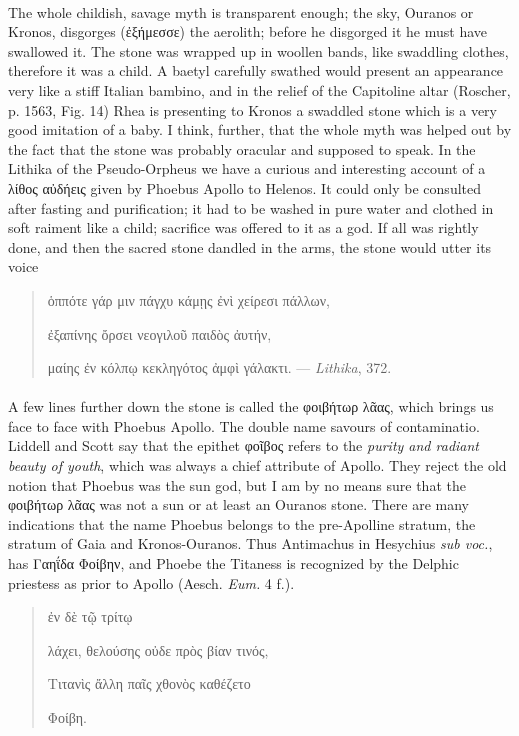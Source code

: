 \documentclass[a4paper, 11pt, oneside, polutonikogreek, english]{article}
\begin{document}
\paragraph{}
The whole childish, savage myth is transparent enough; the sky, Ouranos or Kronos, disgorges (ἐξήμεσσε) the aerolith; before he disgorged it he must have swallowed it. The stone was wrapped up in woollen bands, like swaddling clothes, therefore it was a child. A baetyl carefully swathed would present an appearance very like a stiff Italian bambino, and in the relief of the Capitoline altar (Roscher, p. 1563, Fig. 14) Rhea is presenting to Kronos a swaddled stone which is a very good imitation of a baby. I think, further, that the whole myth was helped out by the fact that the stone was probably oracular and supposed to speak. In the Lithika of the Pseudo-Orpheus we have a curious and interesting account of a λίθος αὐδήεις given by Phoebus Apollo to Helenos. It could only be consulted after fasting and purification; it had to be washed in pure water and clothed in soft raiment like a child; sacrifice was offered to it as a god. If all was rightly done, and then the sacred stone dandled in the arms, the stone would utter its voice
\begin{quotation}
ὁππότε γάρ μιν πάγχυ κάμῃς ἐνὶ χείρεσι πάλλων,

ἐξαπίνης ὄρσει νεογιλοῦ παιδὸς ἀυτήν,

μαίης ἐν κόλπῳ κεκληγότος ἀμφὶ γάλακτι. --- \emph{Lithika}, 372.
\end{quotation}
\paragraph{}
A few lines further down the stone is called the φοιβήτωρ λᾶας, which brings us face to face with Phoebus Apollo. The double name savours of contaminatio. Liddell and Scott say that the epithet φοῖβος refers to the \emph{purity and radiant beauty of youth}, which was always a chief attribute of Apollo. They reject the old notion that Phoebus was the sun god, but I am by no means sure that the φοιβήτωρ λᾶας was not a sun or at least an Ouranos stone. There are many indications that the name Phoebus belongs to the pre-Apolline stratum, the stratum of Gaia and Kronos-Ouranos. Thus Antimachus in Hesychius \emph{sub voc.}, has Γαηΐδα Φοίβην, and Phoebe the Titaness is recognized by the Delphic priestess as prior to Apollo (Aesch. \emph{Eum.} 4 f.).
\begin{quotation}
\hspace*{15mm}ἐν δὲ τῷ τρίτῳ

λάχει, θελούσης οὐδε πρὸς βίαν τινός,

Τιτανὶς ἄλλη παῖς χθονὸς καθέζετο

Φοίβη.
\end{quotation}
\end{document}
